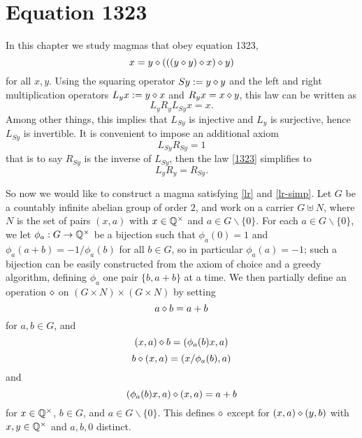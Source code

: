 \chapter{Equation 1323}\label{1323-chapter}

In this chapter we study magmas that obey equation 1323,
\begin{equation}\label{1323}
  x = y \diamond (((y \diamond y) \diamond x) \diamond y)
\end{equation}
for all $x,y$.  Using the squaring operator $Sy := y \diamond y$ and the left and right multiplication operators $L_y x := y \diamond x$ and $R_y x = x \diamond y$, this law can be written as
$$ L_y R_y L_{Sy} x = x.$$
Among other things, this implies that $L_{Sy}$ is injective and $L_y$ is surjective, hence $L_{Sy}$ is invertible.  It is convenient to impose an additional axiom
\begin{equation}\label{lr}
 L_{Sy} R_{Sy} = 1
\end{equation}
that is to say $R_{Sy}$ is the inverse of $L_{Sy}$, then the law \eqref{1323} simplifies to
\begin{equation}\label{lr-simp}
  L_{y} R_{y} = R_{Sy}.
\end{equation}

 So now we would like to construct a magma satisfying \eqref{lr} and \eqref{lr-simp}.  Let $G$ be a countably infinite abelian group of order $2$, and work on a carrier $G \uplus N$, where $N$ is the set of pairs $(x,a)$ with $x \in \mathbb{Q}^\times$ and $a \in G \backslash \{0\}$.  For each $a \in G \backslash \{0\}$, we let $\phi_a: G \to \mathbb{Q}^\times$ be a bijection such that
 $\phi_a(0) = 1$ and $\phi_a(a+b) = -1/\phi_a(b)$ for all $b \in G$, so in particular $\phi_a(a)=-1$; such a bijection can be easily constructed from the axiom of choice and a greedy algorithm, defining $\phi_a$ one pair $\{b,a+b\}$ at a time. We then partially define an operation $\diamond$ on $(G \times N) \times (G \times N)$ by setting
\begin{equation}\label{op-0}
  a \diamond b = a+b
\end{equation}
for $a,b \in G$, and
 \begin{equation}\label{op-1}
 (x,a) \diamond b = (\phi_a(b) x, a)
\end{equation}
\begin{equation}\label{op-2}
  b \diamond (x,a) = (x / \phi_a(b), a)
\end{equation}
and
\begin{equation}\label{op-3}
  (\phi_a(b) x,a) \diamond (x,a) = a+b
\end{equation}
for $x \in \mathbb{Q}^\times$, $b \in G$, and $a \in G \backslash \{0\}$.  This defines $\diamond$ except for $(x,a) \diamond (y,b)$ with $x,y \in \mathbb{Q}^\times$ and $a,b,0$ distinct.

